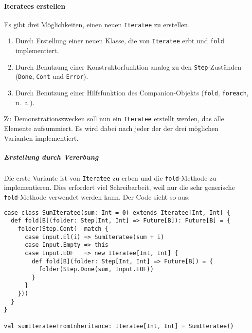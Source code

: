 \documentclass[draft=false
              ,paper=a4
              ,twoside=false
              ,fontsize=11pt
              ,headsepline
              ,BCOR10mm
              ,DIV11
              ]{scrbook}
\begin{document}

\paragraph{Iteratees erstellen} %
\label{par:iteratees_erstellen}\mbox{} %

Es gibt drei Möglichkeiten, einen neuen \lstinline|Iteratee| zu erstellen.
\begin{enumerate}
  \item Durch Erstellung einer neuen Klasse, die von \lstinline|Iteratee| erbt und \lstinline|fold| implementiert.
  \item Durch Benutzung einer Konstruktorfunktion analog zu den \lstinline|Step|-Zuständen (\lstinline|Done|, \lstinline|Cont| und \lstinline|Error|).
  \item Durch Benutzung einer Hilfsfunktion des Companion-Objekts (\lstinline|fold|, \lstinline|foreach|, u.~a.).
\end{enumerate}

Zu Demonstrationszwecken soll nun ein \lstinline|Iteratee| erstellt werden, das alle Elemente aufsummiert.
Es wird dabei nach jeder der der drei möglichen Varianten implementiert.

\subparagraph{Erstellung durch Vererbung} %
\label{subp:erstellung_durch_vererbung}\mbox{} %

Die erste Variante ist von \lstinline|Iteratee| zu erben und die \lstinline|fold|-Methode zu implementieren.
Dies erfordert viel Schreibarbeit, weil nur die sehr generische \lstinline|fold|-Methode verwendet werden kann.
Der Code sieht so aus:

\begin{lstlisting}
case class SumIteratee(sum: Int = 0) extends Iteratee[Int, Int] {
  def fold[B](folder: Step[Int, Int] => Future[B]): Future[B] = {
    folder(Step.Cont(_ match {
      case Input.El(i) => SumIteratee(sum + i)
      case Input.Empty => this
      case Input.EOF   => new Iteratee[Int, Int] {
        def fold[B](folder: Step[Int, Int] => Future[B]) = {
          folder(Step.Done(sum, Input.EOF))
        }
      }
    }))
  }
}

val sumIterateeFromInheritance: Iteratee[Int, Int] = SumIteratee()
\end{lstlisting}
\end{document}
